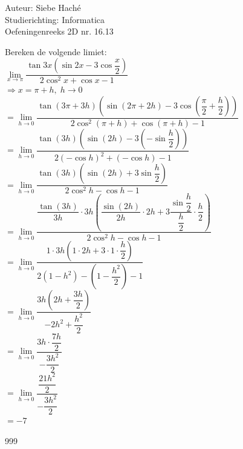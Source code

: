 \documentclass[a4paper]{article}
\begin{document}
\noindent \large Auteur: Siebe Haché \\
\noindent \large Studierichting: Informatica \\
\noindent \large Oefeningenreeks 2D nr. 16.13 \\

\medskip
\normalsize

Bereken de volgende limiet: \\

$ \lim\limits_{x \rightarrow \pi} \dfrac{\tan 3x \left(\sin 2x - 3 \cos \dfrac{x}{2}\right)}{2 \cos^2 x + \cos x - 1} $\\

$ \Rightarrow x = \pi + h,\; h \rightarrow 0 $\\

$ = \lim\limits_{h \rightarrow 0} \dfrac{\tan(3\pi + 3h)\left(\sin(2\pi + 2h) - 3 \cos\left(\dfrac{\pi}{2} + \dfrac{h}{2}\right)\right)}{2 \cos^2(\pi + h) + \cos(\pi + h) - 1}$\\

$ = \lim\limits_{h \rightarrow 0} \dfrac{\tan(3h)\left(\sin(2h) - 3 \left(-\sin \dfrac{h}{2}\right)\right)}{2 (-\cos h)^2 + (-\cos h) - 1} $\\

$ = \lim\limits_{h \rightarrow 0} \dfrac{\tan(3h)\left(\sin(2h) + 3 \sin \dfrac{h}{2}\right)}{2 \cos^2 h - \cos h - 1} $\\

$ = \lim\limits_{h \rightarrow 0} \dfrac{\dfrac{\tan(3h)}{3h}\cdot 3h \left(\dfrac{\sin(2h)}{2h}\cdot 2h + 3 \dfrac{\sin \dfrac{h}{2}}{\dfrac{h}{2}}\cdot \dfrac{h}{2}\right)}{2 \cos^2 h - \cos h - 1} $\\

$ = \lim\limits_{h \rightarrow 0} \dfrac{1 \cdot 3h \left(1 \cdot 2h + 3 \cdot 1 \cdot \dfrac{h}{2}\right)}{2 (1 - h^2) - \left(1 - \dfrac{h^2}{2}\right) - 1} $\\

$ = \lim\limits_{h \rightarrow 0} \dfrac{3h \left(2h + \dfrac{3h}{2}\right)}{-2h^2 + \dfrac{h^2}{2}}$\\

$ = \lim\limits_{h \rightarrow 0} \dfrac{3h \cdot \dfrac{7h}{2}}{-\dfrac{3h^2}{2}}$\\

$ = \lim\limits_{h \rightarrow 0} \dfrac{\dfrac{21 h^2}{2}}{-\dfrac{3 h^2}{2}} $\\

$ = -7 $\\

\begin{thebibliography}{999}
\end{thebibliography}
\end{document}

